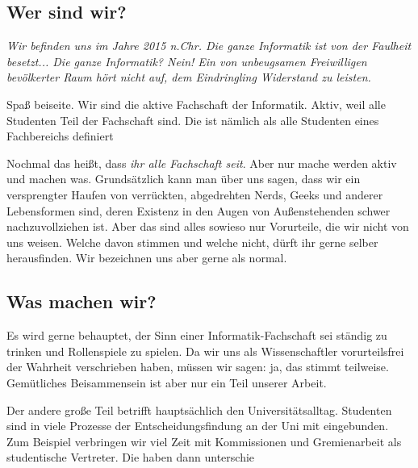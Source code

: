 
	\subsection{Wer sind wir?}
		\glqq\textit{ Wir befinden uns im Jahre 2015 n.Chr. Die ganze Informatik ist von der Faulheit besetzt... Die ganze Informatik? Nein! Ein von unbeugsamen Freiwilligen bevölkerter Raum hört nicht auf, dem Eindringling  Widerstand zu leisten.} \grqq

		Spaß beiseite. Wir sind die aktive Fachschaft der Informatik. Aktiv, weil alle Studenten Teil der Fachschaft sind. Die ist n\"amlich als alle Studenten eines Fachbereichs definiert

        Nochmal das hei{\ss}t, dass \emph{ihr alle Fachschaft seit}. Aber nur mache werden aktiv und machen was. %
		Grundsätzlich kann man über uns sagen, dass wir ein versprengter Haufen von verrückten, abgedrehten Nerds, Geeks und anderer Lebensformen sind, deren Existenz in den Augen von Außenstehenden schwer nachzuvollziehen ist.
        Aber das sind alles sowieso nur Vorurteile, die wir nicht von uns weisen. Welche davon stimmen und welche nicht, dürft ihr gerne selber herausfinden. Wir bezeichnen uns aber gerne als normal. 	



	\subsection{Was machen wir?}
        Es wird gerne behauptet, der Sinn einer Informatik-Fachschaft sei st\"andig zu trinken und Rollenspiele zu spielen.
        Da wir uns als Wissenschaftler vorurteilsfrei der Wahrheit verschrieben haben, m\"ussen wir sagen: ja, das stimmt teilweise.
        Gem\"utliches Beisammensein ist aber nur ein Teil unserer Arbeit.
        
        Der andere große Teil betrifft hauptsächlich den Universitätsalltag.
        Studenten sind in viele Prozesse der Entscheidungsfindung an der Uni
        mit eingebunden.
        Zum Beispiel verbringen wir viel Zeit mit Kommissionen und Gremienarbeit als studentische Vertreter.
        Die haben dann unterschie

